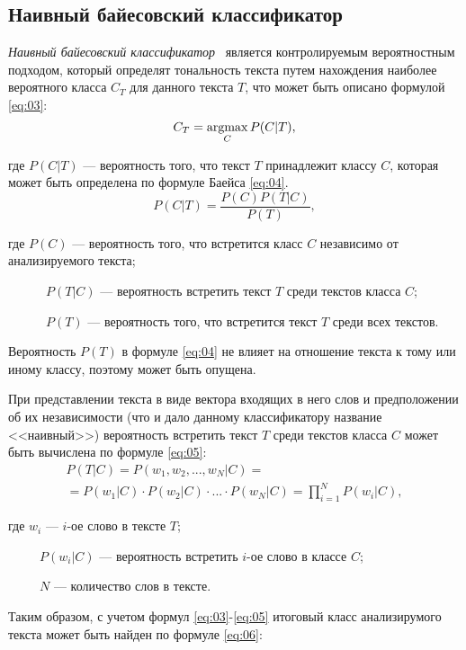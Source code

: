 \subsection{Наивный байесовский классификатор}

\textit{Наивный байесовский классификатор}~\cite{article21} является
контролируемым вероятностным подходом, который определят тональность текста
путем нахождения наиболее вероятного класса $C_T$ для данного текста $T$, что
может быть описано формулой \ref{eq:03}:
\begin{equation}\label{eq:03}
    C_T = \operatorname*{argmax}_C P(C|T),
\end{equation}

где $P(C|T)$ --- вероятность того, что текст $T$ принадлежит классу $C$,
которая может быть определена по формуле Баейса \ref{eq:04}.
\begin{equation}\label{eq:04}
    P(C|T) = \frac{P(C)P(T|C)}{P(T)},
\end{equation}

где $P(C)$ --- вероятность того, что встретится класс $C$ независимо от
анализируемого текста;

~~~~~~$P(T|C)$ --- вероятность встретить текст $T$ среди текстов класса $C$;

~~~~~~$P(T)$ --- вероятность того, что встретится текст $T$ среди всех текстов.

Вероятность $P(T)$ в формуле \ref{eq:04} не влияет на отношение текста к тому
или иному классу, поэтому может быть опущена.

При представлении текста в виде вектора входящих в него слов и предположении об
их независимости (что и дало данному классификатору название <<наивный>>)
вероятность встретить текст $T$ среди текстов класса $C$ может быть вычислена по
формуле \ref{eq:05}:
\begin{multline}\label{eq:05}
    P(T|C) = P(w_1, w_2, ..., w_N|C) = \\ =P(w_1|C) \cdot P(w_2|C) \cdot ...
    \cdot P(w_N|C) = \prod\limits_{i=1}^{N} P(w_i|C),
\end{multline}

где $w_i$ --- $i$-ое слово в тексте $T$;

~~~~~$P(w_i|C)$ --- вероятность встретить $i$-ое слово в классе $C$;

~~~~~$N$ --- количество слов в тексте.

Таким образом, с учетом формул \ref{eq:03}-\ref{eq:05} итоговый класс
анализирумого текста может быть найден по формуле \ref{eq:06}:

